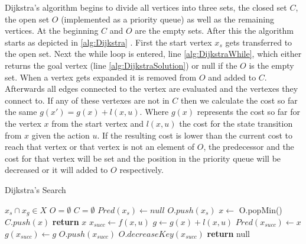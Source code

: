 Dijkstra's algorithm begins to divide all vertices into three sets, the closed set $C$, the open set $O$ (implemented as a priority queue) as well as the remaining vertices. At the beginning $C$ and $O$ are the empty sets. After this the algorithm starts as depicted in \ref{alg:Dijkstra} \cite{Dijkstra.1959}. First the start vertex $x_s$ gets transferred to the open set. Next the while loop is entered, line \ref{alg:DijkstraWhile}, which either returns the goal vertex (line \ref{alg:DijkstraSolution}) or null if the $O$ is the empty set. When a vertex gets expanded it is removed from $O$ and added to $C$. Afterwards all edges connected to the vertex are evaluated and the vertexes they connect to. If any of these vertexes are not in $C$ then we calculate the cost so far the same $g(x') = g(x) + l(x,u)$. Where $g(x)$ represents the cost so far for the vertex $x$ from the start vertex and $l(x,u)$ the cost for the state transition from $x$ given the action $u$. If the resulting cost is lower than the current cost to reach that vertex or that vertex is not an element of $O$, the predecessor and the cost for that vertex will be set and the position in the priority queue will be decreased or it will added to $O$ respectively.

\begin{algorithm}
    \caption{Dijkstra's Search}\label{alg:Dijkstra}
    \begin{algorithmic}[1]
        \Require $x_s \cap x_g \in X$
        \State $O = \emptyset$
        \State $C = \emptyset$
        \State $Pred(x_s) \gets null$
        \State $O.push(x_s)$
         \label{alg:DijkstraWhile}
            \State $x \gets$ O.popMin()
            \State $C.push(x)$
                \State \textbf{return} $x$ \label{alg:DijkstraSolution}
            \Else
                \State $x_{succ} \gets f(x,u)$
                        \State $g \gets g(x) + l(x,u)$
                            \State $Pred(x_{succ}) \gets x$
                            \State $g(x_{succ}) \gets g$
                                \State $O.push(x_{succ})$
                            \Else
                                \State $O.decreaseKey(x_{succ})$
                            \EndIf
                        \EndIf
                    \EndIf
                \EndFor
            \EndIf
        \EndWhile
        \State \textbf{return} null
    \end{algorithmic}
\end{algorithm}

